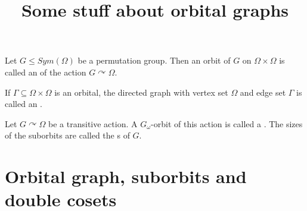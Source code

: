 \documentclass[fontsize=11pt,fleqn,a4paper]{scrartcl}
\title{Some stuff about orbital graphs}
\begin{document}
\maketitle

\begin{definition}
Let $G\leq Sym(\Omega)$ be a permutation group. Then an orbit of $G$ on $\Omega\times\Omega$ is called an  of the action $G \curvearrowright \Omega$.

If $\Gamma\subseteq\Omega\times\Omega$ is an orbital, the directed graph with vertex set $\Omega$ and edge set $\Gamma$ is called an .
\end{definition}

\begin{definition}
Let $G\curvearrowright\Omega$ be a transitive action. A $G_\omega$-orbit of this action is called a . The sizes of the suborbits are called the s of $G$.
\end{definition}

\section{Orbital graph, suborbits and double cosets}
\end{document}
